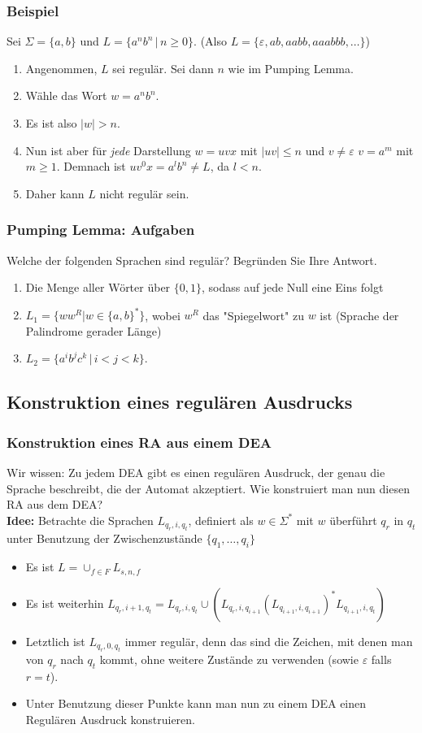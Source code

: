 \begin{frame}
\frametitle{Beispiel}
Sei $\Sigma = \{a, b\}$ und $L = \{a^nb^n\,|\,n\geq0\}$. (Also $L = \{\varepsilon,ab, aabb, aaabbb, \ldots\}$)
\begin{enumerate}
\item Angenommen, $L$ sei regulär. Sei dann $n$ wie im Pumping Lemma.
\item Wähle das Wort $w = a^nb^n$.
\item Es ist also $\left|w\right| > n$.
\item Nun ist aber für \emph{jede} Darstellung $w = uvx$ mit $\left|uv\right| \leq n$ und $v \neq \varepsilon$ $v = a^m$ mit $m \geq 1$. Demnach ist $uv^0x = a^lb^n \neq L$, da $l < n$.
\item Daher kann $L$ nicht regulär sein.
\end{enumerate}

\end{frame}

\begin{frame}
\frametitle{Pumping Lemma: Aufgaben}
Welche der folgenden Sprachen sind regulär? Begründen Sie Ihre Antwort.

\begin{enumerate}
\item Die Menge aller Wörter über $\{0, 1\}$, sodass auf jede Null eine Eins folgt
\item $L_1 = \{ww^R | w \in \{a,b\}^*\}$, wobei $w^R$ das "Spiegelwort" zu $w$ ist (Sprache der Palindrome gerader Länge)
\item $L_2 = \{a^ib^jc^k \, | \, i < j < k\}$.
\end{enumerate}

\end{frame}

\subsection{Konstruktion eines regulären Ausdrucks}
\begin{frame}
\frametitle{Konstruktion eines RA aus einem DEA}
Wir wissen: Zu jedem DEA gibt es einen regulären Ausdruck, der genau die Sprache beschreibt, die der Automat akzeptiert. Wie konstruiert man nun diesen RA aus dem DEA?\\[0.6cm]
\textbf{Idee:} Betrachte die Sprachen $L_{q_r,i,q_t}$, definiert als \( w \in \Sigma^*\) mit $w$ überführt $q_r$ in $q_t$ unter Benutzung der Zwischenzustände $\{q_1,\ldots,q_i\}$
\begin{itemize}
\item Es ist $L = \cup_{f\in F} L_{s,n,f}$
\item Es ist weiterhin $L_{q_r,i+1,q_t} = L_{q_r,i,q_t} \cup (L_{q_r,i,q_{i+1}}(L_{q_{i+1},i,q_{i+1}})^*L_{q_{i+1},i,q_t})$
\item Letztlich ist $L_{q_r, 0, q_t}$ immer regulär, denn das sind die Zeichen, mit denen man von $q_r$ nach $q_t$ kommt, ohne weitere Zustände zu verwenden (sowie $\varepsilon$ falls $r = t$).
\item Unter Benutzung dieser Punkte kann man nun zu einem DEA einen Regulären Ausdruck konstruieren.
\end{itemize}
\end{frame}

